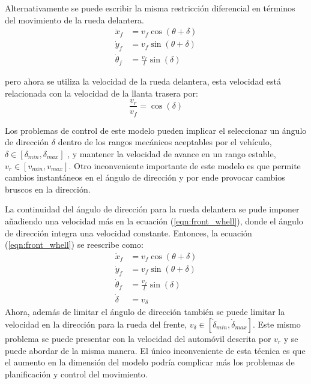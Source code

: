 Alternativamente se puede escribir la misma restricción diferencial en términos del movimiento de la rueda delantera.
\begin{equation}
    \begin{split}
        \dot{x}_f & = v_f \cos{(\theta + \delta)} \\
        \dot{y}_f & = v_f \sin{(\theta + \delta)} \\
        \dot{\theta}_f & = \frac{v_f}{l}\sin{(\delta)}
        \label{eqn:front_whell}
    \end{split}
\end{equation}

pero ahora se utiliza la velocidad de la rueda delantera, esta velocidad está relacionada con la velocidad de la llanta trasera por:
\begin{equation}
    \frac{v_r}{v_f} = \cos{(\delta)}
\end{equation}

Los problemas de control de este modelo pueden implicar el seleccionar un ángulo de dirección $\delta$ dentro de los rangos mecánicos aceptables por el vehículo, $ \delta \in [\delta_{min}, \delta_{max}]$ , y mantener la velocidad de avance en un rango estable, $v_r \in [v_{min}, v_{max}]$. Otro inconveniente importante de este modelo es que permite cambios instantáneos en el ángulo de dirección y por ende provocar cambios bruscos en la dirección.

La continuidad del ángulo de dirección para la rueda delantera se pude imponer añadiendo una velocidad más en la ecuación (\ref{eqn:front_whell}), donde el ángulo de dirección integra una velocidad constante. Entonces, la ecuación (\ref{eqn:front_whell}) se reescribe como:
\begin{equation}
    \begin{split}
        \dot{x}_f & = v_f \cos{(\theta + \delta)} \\
        \dot{y}_f & = v_f \sin{(\theta + \delta)} \\
        \dot{\theta}_f & = \frac{v_f}{l}\sin{(\delta)} \\
        \dot{\delta} & = v_{\delta}
    \end{split}
\end{equation}
Ahora, además de limitar el ángulo de dirección también se puede limitar la velocidad en la dirección para la rueda del frente, $v_{\delta} \in [\dot{\delta}_{min}, \dot{\delta}_{max}]$. Este mismo problema se puede presentar con la velocidad del automóvil descrita por $v_r$ y se puede abordar de la misma manera. El único inconveniente de esta técnica es que el aumento en la dimensión del modelo podría complicar más los problemas de planificación y control del movimiento.

